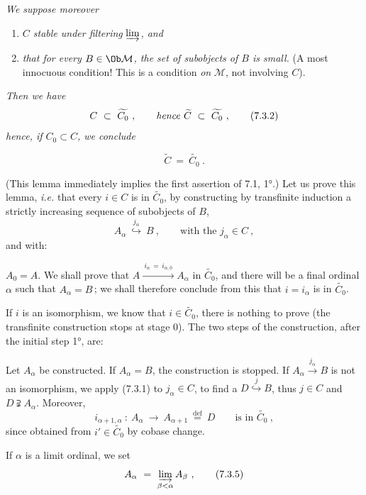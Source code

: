 \textit{We suppose moreover}
\begin{enumerate}[label={}]
\item[\cercle{c}] \textit{$C$ stable under filtering} $\varinjlim$\textit{, and}
\item[\cercle{d}] \textit{that for every $B \in \Ob \mathcal{M}$, the set of subobjects of $B$ is small.} (A most innocuous condition! This is a condition \textit{on} $\mathcal{M}$, not involving $C$).
\end{enumerate}
\textit{Then we have}
\[
C \ \subset \ \widetilde{C_0} \ , \qquad \text{\textit{hence} } \widetilde{C} \ \subset \ \widetilde{C_0} \ , \tag*{(7.3.2)}
\]
\textit{hence, if $C_0 \subset C$, we conclude}

\[
\widetilde{C} \ = \ \widetilde{C_0} \ . \tag*{(7.3.3)}
\]


(This lemma immediately implies the first assertion of 7.1, 1°.) Let us prove this lemma, \textit{i.e.} that every $i \in C$ is in $\widetilde{C_0}$, by constructing by transfinite induction a strictly increasing sequence of subobjects of $B$,
\[
A_\alpha \ \overset{j_\alpha}{\hookrightarrow} \ B \ , \qquad \text{with the } j_\alpha \in C \ ,
\]
and with:

 $A_0 = A$. We shall prove that $A \xrightarrow{\ i_\alpha \,=\, i_{\alpha,0}\ } A_\alpha$ in $\widetilde{C_0}$, and there will be a final ordinal $\alpha$ such that $A_\alpha = B$\,; we shall therefore conclude from this that $i = i_\alpha$ is in $\widetilde{C_0}$.

If $i$ is an isomorphism, we know that $i \in \widetilde{C_0}$, there is nothing to prove (the transfinite construction stops at stage 0). The two steps of the construction, after the initial step 1°, are:

 Let $A_\alpha$ be constructed. If $A_\alpha = B$, the construction is stopped. If $A_\alpha \xrightarrow{j_\alpha} B$ is not an isomorphism, we apply (7.3.1) to $j_\alpha \in C$, to find a $D \overset{j}{\hookrightarrow} B$, thus $j \in C$ and $D \supsetneqq A_\alpha$. Moreover,
\[
i_{\alpha+1,\alpha} \ : \ A_\alpha \ \longrightarrow \ A_{\alpha+1} \ \overset{\text{def}}{=} \ D \qquad \text{is in } \widetilde{C_0} \ , \tag*{(7.3.4)}
\]
since obtained from $i' \in \widetilde{C_0}$ by cobase change.

 If $\alpha$ is a limit ordinal, we set
\[
A_\alpha \ = \ \varinjlim_{\beta < \alpha} A_\beta \ , \tag*{(7.3.5)}
\]

